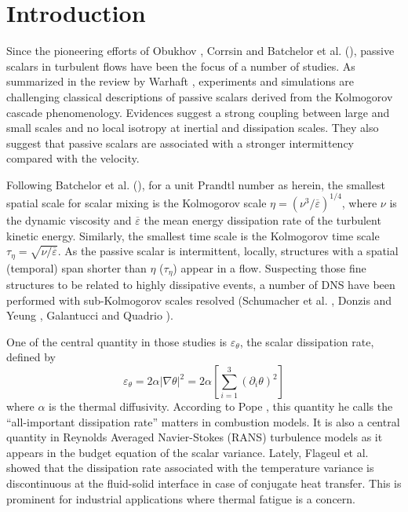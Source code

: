 \documentclass[review]{elsarticle}
\newcommand{\gqcite}{Galantucci and Quadrio \cite{galantucci2010very}}
\newcommand{\epst}{\varepsilon_\theta}
\begin{document}
\section{Introduction}

Since the pioneering efforts of Obukhov \cite{obukhov1968structure}, Corrsin \cite{corrsin1951spectrum} and Batchelor et al. (\cite{batchelor1959small,batchelor1959small2}), passive scalars in turbulent flows have been the focus of a number of studies. As summarized in the review by Warhaft \cite{warhaft2000passive}, experiments and simulations are challenging classical descriptions of passive scalars derived from the Kolmogorov cascade phenomenology. Evidences suggest a strong coupling between large and small scales and no local isotropy at inertial and dissipation scales. They also suggest that passive scalars are associated with a stronger intermittency compared with the velocity.

Following Batchelor et al. (\cite{batchelor1959small,batchelor1959small2}), for a unit Prandtl number as herein, the smallest spatial scale for scalar mixing is the Kolmogorov scale $\eta = \left( \nu^3 / \overline{\varepsilon} \right)^{1/4}$, where $\nu$ is the dynamic viscosity and $\overline{\varepsilon}$ the mean energy dissipation rate of the turbulent kinetic energy. Similarly, the smallest time scale is the Kolmogorov time scale $\tau_\eta = \sqrt{\nu / \overline{\varepsilon}}$. As the passive scalar is intermittent, locally, structures with a spatial (temporal) span shorter than $\eta$ ($\tau_\eta$) appear in a flow. Suspecting those fine structures to be related to highly dissipative events, a number of DNS have been performed with sub-Kolmogorov scales resolved (Schumacher et al. \cite{schumacher2005very}, Donzis and Yeung \cite{donzis2010resolution}, \gqcite).

One of the central quantity in those studies is $\epst$, the scalar dissipation rate, defined by 
\begin{equation}
\epst = 2 \alpha \lvert \nabla \theta \rvert^2 = 2 \alpha \left[ \sum_{i=1}^{3} \left( \partial_i \theta \right)^2 \right]
\end{equation}
where $\alpha$ is the thermal diffusivity. According to Pope \cite{pope2013small}, this quantity he calls the “all-important dissipation rate” matters in combustion models. It is also a central quantity in Reynolds Averaged Navier-Stokes (RANS) turbulence models as it appears in the budget equation of the scalar variance. Lately, Flageul et al. \cite{flageul2017discontinuity} showed that the dissipation rate associated with the temperature variance is discontinuous at the fluid-solid interface in case of conjugate heat transfer. This is prominent for industrial applications where thermal fatigue is a concern.
\end{document}
